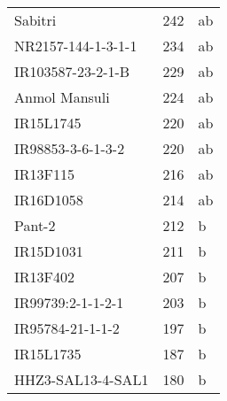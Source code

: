 \documentclass[]{article}
\begin{document}
\begin{longtable}{lll}
\rowcolor{gray!6}  Sabitri & 242 & ab\\
NR2157-144-1-3-1-1 & 234 & ab\\
\addlinespace
\rowcolor{gray!6}  IR103587-23-2-1-B & 229 & ab\\
Anmol Mansuli & 224 & ab\\
\rowcolor{gray!6}  IR15L1745 & 220 & ab\\
IR98853-3-6-1-3-2 & 220 & ab\\
\rowcolor{gray!6}  IR13F115 & 216 & ab\\
\addlinespace
IR16D1058 & 214 & ab\\
\rowcolor{gray!6}  Pant-2 & 212 & b\\
IR15D1031 & 211 & b\\
\rowcolor{gray!6}  IR13F402 & 207 & b\\
IR99739:2-1-1-2-1 & 203 & b\\
\addlinespace
\rowcolor{gray!6}  IR95784-21-1-1-2 & 197 & b\\
IR15L1735 & 187 & b\\
\rowcolor{gray!6}  HHZ3-SAL13-4-SAL1 & 180 & b\\
\bottomrule
\end{longtable}
\endgroup{}
\begingroup\fontsize{12}{14}\selectfont
\end{document}
